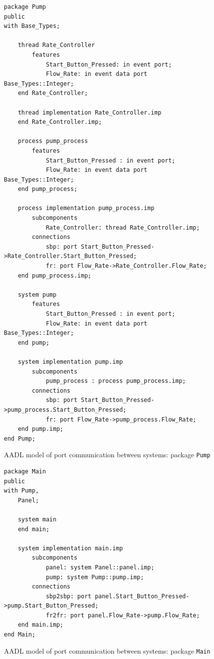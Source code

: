 \begin{figure}[ht]
\singlespacing
\begin{lstlisting}[language=aadl, frame=single, gobble=0]
package Pump
public
with Base_Types;

	thread Rate_Controller
		features 
			Start_Button_Pressed: in event port;
			Flow_Rate: in event data port Base_Types::Integer;
	end Rate_Controller;
	
	thread implementation Rate_Controller.imp
	end Rate_Controller.imp;
	
	process pump_process
		features
			Start_Button_Pressed : in event port;
			Flow_Rate: in event data port Base_Types::Integer;
	end pump_process;
	
	process implementation pump_process.imp
		subcomponents
			Rate_Controller: thread Rate_Controller.imp;
		connections		
			sbp: port Start_Button_Pressed->Rate_Controller.Start_Button_Pressed;
			fr: port Flow_Rate->Rate_Controller.Flow_Rate;
	end pump_process.imp;
	
	system pump
		features
			Start_Button_Pressed : in event port;
			Flow_Rate: in event data port Base_Types::Integer;
	end pump;
	
	system implementation pump.imp
		subcomponents
			pump_process : process pump_process.imp;
		connections
			sbp: port Start_Button_Pressed->pump_process.Start_Button_Pressed;
			fr: port Flow_Rate->pump_process.Flow_Rate;
	end pump.imp;
end Pump;
\end{lstlisting} 
\doublespacing
\caption{AADL model of port communication between systems: package \lstinline{Pump}}
\label{listing:port_communication_pump}
\end{figure}

\begin{figure}[ht]
\singlespacing
\begin{lstlisting}[language=aadl, frame=single, gobble=0]
package Main
public
with Pump,
	Panel;

	system main	
	end main;
	
	system implementation main.imp
		subcomponents
			panel: system Panel::panel.imp;
			pump: system Pump::pump.imp;
		connections
			sbp2sbp: port panel.Start_Button_Pressed->pump.Start_Button_Pressed;
			fr2fr: port panel.Flow_Rate->pump.Flow_Rate;
	end main.imp;
end Main;
\end{lstlisting} 
\doublespacing
\caption{AADL model of port communication between systems: package \lstinline{Main}}
\label{listing:port_communication_main}
\end{figure}

